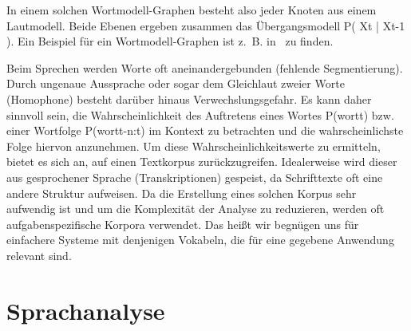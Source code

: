 In einem solchen Wortmodell-Graphen besteht also jeder Knoten aus einem Lautmodell.
Beide Ebenen ergeben zusammen das Übergangsmodell P( Xt | Xt-1 ).
Ein Beispiel für ein Wortmodell-Graphen ist z.~B. in~\cite[S. 1058]{russelnorvig} zu finden.

Beim Sprechen werden Worte oft aneinandergebunden (fehlende Segmentierung).
Durch ungenaue Aussprache oder sogar dem Gleichlaut zweier Worte (Homophone) besteht darüber hinaus Verwechslungsgefahr.
Es kann daher sinnvoll sein, die Wahrscheinlichkeit des Auftretens eines Wortes P(wortt) bzw.
einer Wortfolge P(wortt-n:t) im Kontext zu betrachten und die wahrscheinlichste Folge hiervon anzunehmen.
Um diese Wahrscheinlichkeitswerte zu ermitteln, bietet es sich an, auf einen Textkorpus zurückzugreifen.
Idealerweise wird dieser aus gesprochener Sprache (Transkriptionen) gespeist, da Schrifttexte oft eine andere Struktur aufweisen.
Da die Erstellung eines solchen Korpus sehr aufwendig ist und um die Komplexität der Analyse zu reduzieren, werden oft aufgabenspezifische Korpora verwendet.
Das heißt wir begnügen uns für einfachere Systeme mit denjenigen Vokabeln, die für eine gegebene Anwendung relevant sind.

\section{Sprachanalyse}
